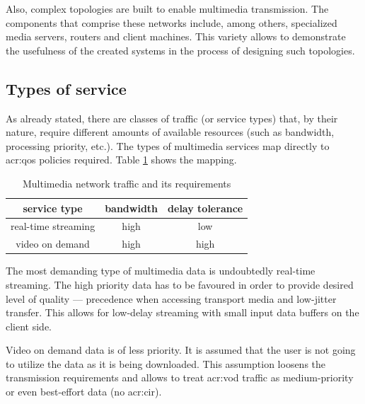 \documentclass[11pt]{book}
\begin{document}
      Also, complex topologies are built to enable multimedia transmission. The components that comprise these networks
      include, among others, specialized media servers, routers and client machines. This variety allows to demonstrate
      the usefulness of the created systems in the process of designing such topologies.


      \subsection{Types of service}
      
        As already stated, there are classes of traffic (or service types) that, by their nature, require different
        amounts of available resources (such as bandwidth, processing priority, etc.). The types of multimedia services
        map directly to \gls{acr:qos} policies required. Table \ref{tab:uc:qos} shows the mapping.

        \begin{table}[H]
          \begin{center}
            \begin{tabular}{|c|c|c|}
              \hline
              service type        & bandwidth & delay tolerance \\
              \hline \hline
              real-time streaming & high      & low \\
              \hline
              video on demand     & high      & high  \\
              \hline
            \end{tabular}
          \end{center}


          \caption{Multimedia network traffic and its requirements}
          \label{tab:uc:qos}
        \end{table}

        The most demanding type of multimedia data is undoubtedly real-time streaming. The high priority data has to be
        favoured in order to provide desired level of quality --- precedence when accessing transport media and
        low-jitter transfer. This allows for low-delay streaming with small input data buffers on the client side.

        Video on demand data is of less priority. It is assumed that the user is not going to utilize the data as it is
        being downloaded. This assumption loosens the transmission requirements and allows to treat \gls{acr:vod}
        traffic as medium-priority or even best-effort data (no \gls{acr:cir}).
\end{document}
